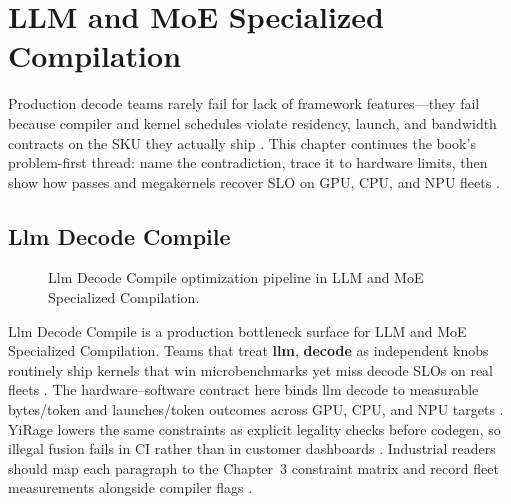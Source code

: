 \chapter{LLM and MoE Specialized Compilation}
\label{chap:ch23}

Production decode teams rarely fail for lack of framework features---they fail because compiler and kernel schedules violate residency, launch, and bandwidth contracts on the SKU they actually ship \citep{patel2025llminference,nvidia2022hopper}. This chapter continues the book's problem-first thread: name the contradiction, trace it to hardware limits, then show how passes and megakernels recover SLO on GPU, CPU, and NPU fleets \citep{taxbreak2026,semianalysis2024tma}.

\section{Llm Decode Compile}
\label{sec:llm_decode_compile}
\begin{figure}[t]
\centering
{}
\caption{Llm Decode Compile optimization pipeline in LLM and MoE Specialized Compilation.}
\label{fig:llm_decode_compile_pipeline}
\end{figure}


Llm Decode Compile is a production bottleneck surface for LLM and MoE Specialized Compilation. Teams that treat \textbf{llm}, \textbf{decode} as independent knobs routinely ship kernels that win microbenchmarks yet miss decode SLOs on real fleets \citep{patel2025llminference,nvidia2022hopper}. The hardware--software contract here binds llm decode to measurable bytes/token and launches/token outcomes across GPU, CPU, and NPU targets \citep{taxbreak2026,semianalysis2024tma}. YiRage lowers the same constraints as explicit legality checks before codegen, so illegal fusion fails in CI rather than in customer dashboards \citep{memoryfloor2026,amd2024xdna}. Industrial readers should map each paragraph to the Chapter~3 constraint matrix and record fleet measurements alongside compiler flags \citep{nvidia2022hopper,amd2024aie}.

